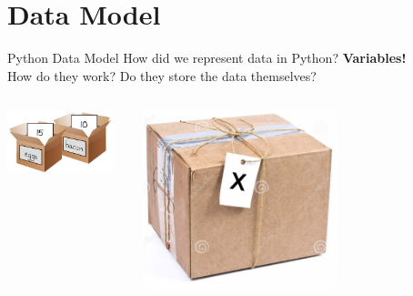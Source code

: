     \section{Data Model}
    \begin{frame}{Python Data Model}
        \pause
        \LARGE
        How did we represent data in Python?
        \pause
         \textbf{Variables!}\\
        \pause
        How do they work?
        \pause
         Do they store the data themselves?
        \pause
        \begin{columns}
            \begin{column}{0.5\textwidth}
                \includegraphics[width=0.9\textwidth]{images/box.jpg}
            \end{column}
            \pause
            \begin{column}{0.5\textwidth}
                \includegraphics[width=0.6\textwidth]{images/box_tag.jpg}
            \end{column}
        \end{columns}
        
    \end{frame}

